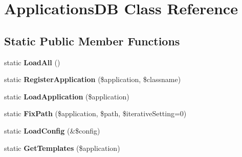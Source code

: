 \hypertarget{class_hypo_conf_1_1_config_scopes_1_1_applications_d_b}{
\section{\-Applications\-D\-B \-Class \-Reference}
\label{class_hypo_conf_1_1_config_scopes_1_1_applications_d_b}
}
\subsection*{\-Static \-Public \-Member \-Functions}
\begin{DoxyCompactItemize}
\item 
\hypertarget{class_hypo_conf_1_1_config_scopes_1_1_applications_d_b_a25bfd065125a7c733c4a56d48e4d1d9b}{
static {\bfseries \-Load\-All} ()}
\label{class_hypo_conf_1_1_config_scopes_1_1_applications_d_b_a25bfd065125a7c733c4a56d48e4d1d9b}

\item 
\hypertarget{class_hypo_conf_1_1_config_scopes_1_1_applications_d_b_abf191eca2e9a618d9f8986de3d242d9a}{
static {\bfseries \-Register\-Application} (\$application, \$classname)}
\label{class_hypo_conf_1_1_config_scopes_1_1_applications_d_b_abf191eca2e9a618d9f8986de3d242d9a}

\item 
\hypertarget{class_hypo_conf_1_1_config_scopes_1_1_applications_d_b_a3db8e744dba8191e0ecab5b6c7b94329}{
static {\bfseries \-Load\-Application} (\$application)}
\label{class_hypo_conf_1_1_config_scopes_1_1_applications_d_b_a3db8e744dba8191e0ecab5b6c7b94329}

\item 
\hypertarget{class_hypo_conf_1_1_config_scopes_1_1_applications_d_b_a5ebb3e641254805c6b505e735a482d4f}{
static {\bfseries \-Fix\-Path} (\$application, \$path, \$iterative\-Setting=0)}
\label{class_hypo_conf_1_1_config_scopes_1_1_applications_d_b_a5ebb3e641254805c6b505e735a482d4f}

\item 
\hypertarget{class_hypo_conf_1_1_config_scopes_1_1_applications_d_b_a6654c2d0c4bbe304bafc891feedf953f}{
static {\bfseries \-Load\-Config} (\&\$config)}
\label{class_hypo_conf_1_1_config_scopes_1_1_applications_d_b_a6654c2d0c4bbe304bafc891feedf953f}

\item 
\hypertarget{class_hypo_conf_1_1_config_scopes_1_1_applications_d_b_a7ae87af2ee759363086638197648801f}{
static {\bfseries \-Get\-Templates} (\$application)}
\label{class_hypo_conf_1_1_config_scopes_1_1_applications_d_b_a7ae87af2ee759363086638197648801f}


\end{DoxyCompactItemize}
